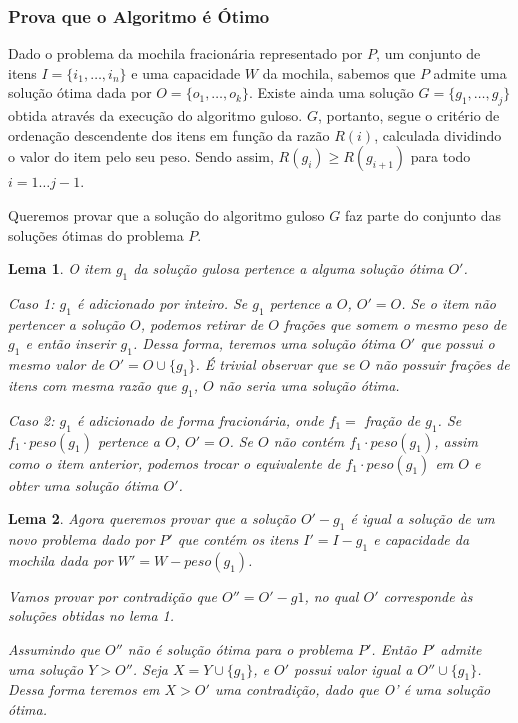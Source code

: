 \documentclass[a4paper, 11pt]{article}
\newtheorem{lemma}{Lema}
\begin{document}
\subsubsection{Prova que o Algoritmo é Ótimo}

Dado o problema da mochila fracionária representado por $P$, um conjunto de itens $I = \{i_1,\ldots,i_n\}$ e uma capacidade $W$ da mochila, sabemos que $P$ admite uma solução ótima dada por $O = \{o_1,\ldots,o_k\}$.
Existe ainda uma solução $G = \{g_1,\ldots,g_j\}$ obtida através da execução do algoritmo guloso.
$G$, portanto, segue o critério de ordenação descendente dos itens em função da razão $R(i)$, calculada dividindo o valor do item pelo seu peso.
Sendo assim, $R(g_i) \ge R(g_{i+1})$ para todo $i = 1\ldots j-1$.

Queremos provar que a solução do algoritmo guloso $G$ faz parte do conjunto das soluções ótimas do problema $P$.

\begin{lemma}
O item $g_1$ da solução gulosa pertence a alguma solução ótima $O'$.

Caso 1: $g_1$ é adicionado por inteiro.
Se $g_1$ pertence a $O$, $O' = O$. Se o item não pertencer a solução $O$, podemos retirar de $O$ frações que somem o mesmo peso de $g_1$ e então inserir $g_1$.
Dessa forma, teremos uma solução ótima $O'$ que possui o mesmo valor de $O' = O \cup \{g_1\}$.
É trivial observar que se $O$ não possuir frações de itens com mesma razão que $g_1$, $O$ não seria uma solução ótima.

Caso 2: $g_1$ é adicionado de forma fracionária, onde $f_1 =$ fração de $g_1$.
Se $f_1 \cdot peso(g_1)$ pertence a $O$, $O' = O$. 
Se $O$ não contém $f_1 \cdot peso(g_1)$, assim como o item anterior, podemos trocar o equivalente de $f_1 \cdot peso(g_1)$ em $O$ e obter uma solução ótima $O'$.
\end{lemma}

\begin{lemma}
Agora queremos provar que a solução $O' - {g_1}$ é igual a solução de um novo problema dado por $P'$ que contém os itens $I' = I - {g_1}$ e capacidade da mochila dada por $W' = W - peso(g_1)$.

Vamos provar por contradição que $O'' = O' - {g1}$, no qual $O'$ corresponde às soluções obtidas no lema 1.

Assumindo que $O''$ não é solução ótima para o problema $P'$. Então $P'$ admite uma solução $Y > O''$. Seja $X = Y \cup \{g_1\}$, e $O'$ possui valor igual a $O'' \cup \{g_1\}$. Dessa forma teremos em $X > O'$ uma contradição, dado que O' é uma solução ótima.
\end{lemma}
\end{document}
